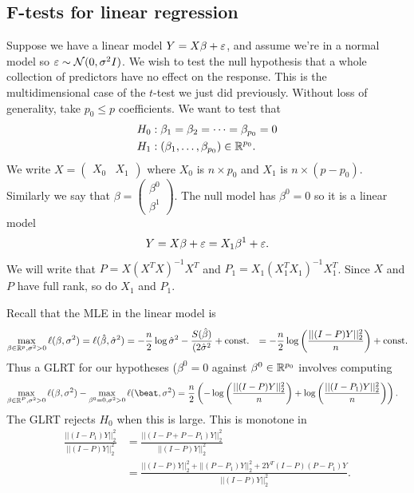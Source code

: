 \documentclass{article}
\begin{document}
\subsection{F-tests for linear regression}
Suppose we have a linear model $ Y = X\beta + \varepsilon $, and assume we're in a normal model so $ \varepsilon\sim\mathcal N (0,\sigma^2 I) $. We wish to test the null hypothesis that a whole collection of predictors have no effect on the response. This is the multidimensional case of the $ t $-test	 we just did previously. Without loss of generality, take $ p_0\le p $ coefficients. We want to test that
\begin{align*}
	H_0&: \beta_1 = \beta_2 = \cdots = \beta_{p_0} = 0 \\
	H_1 &: (\beta_1,\dots, \beta_{p_0}) \in \mathbb{R}^{p_0}.
\end{align*}
We write $ X = \begin{pmatrix}
	X_0 & X_1
\end{pmatrix}$ where $ X_0 $ is $ n\times p_0 $ and $ X_1 $ is $ n\times(p-p_0) $. Similarly we say that $ \beta = \begin{pmatrix}
   \beta^0 \\ \beta^1
\end{pmatrix} $. The null model has $ \beta^0 = 0 $ so it is a linear model
\[
  Y = X\beta + \varepsilon = X_1 \beta^1 +\varepsilon.
\]
We will write that $ P = X(X^TX)^{-1}X^T $ and $ P_1 = X_1(X_1^TX_1)^{-1}X_1^T $. Since $ X $ and $ P $ have full rank, so do $ X_1 $ and $ P_1 $.
\par
Recall that the MLE in the linear model is
\begin{align*}
	\max_{\beta\in \mathbb{R}^p,\sigma^2>0}\ell(\beta,\sigma^2) &= \ell(\hat\beta,\hat\sigma^2) = -\frac n2 \log\hat\sigma^2 - \frac{S(\hat\beta)}{(2\hat\sigma^2} + \text{const.}
							    &= - \frac n2 \log\left(\frac{||(I-P)Y||_2^2}n\right) + \text{const.}
\end{align*}
Thus a GLRT for our hypotheses ($ \beta^0 = 0 $ against $ \beta^0 \in \mathbb{R}^{p_0} $ involves computing
\begin{align*}
	\max_{\beta\in\R^P,\sigma^2>0}\ell(\beta,\sigma^2) - \max_{\beta^0 = 0, \sigma^2>0} \ell(\beat,\sigma^2) &= \frac n2 \left(-\log\left(\frac{||(I-P)Y||_2^2}n\right)+\log\left(\frac{||(I-P_1)Y||_2^2}n\right)\right).
\end{align*}
The GLRT rejects $ H_0 $ when this is large. This is monotone in
\begin{align*}
	\frac{||(I-P_1)Y||_2^2}{||(I-P)Y||_2^2} &= \frac{||(I-P+P-P_1)Y||_2^2}{||(I-P)Y||^2_2} \\
						&= \frac{||(I-P)Y||_2^2+||(P-P_1)Y||_2^2 + 2Y^T(I-P)(P-P_1)Y}{||(I-P)Y||_2^2}.
\end{align*}
\end{document}
